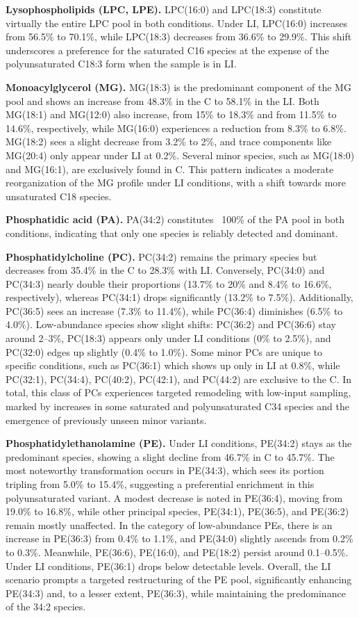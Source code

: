 \documentclass[10pt,letterpaper]{article}
\begin{document}
\textbf{Lysophospholipids (LPC, LPE).} 
LPC(16:0) and LPC(18:3) constitute virtually the entire LPC pool in both conditions. Under LI, LPC(16:0) increases from 56.5\% to 70.1\%, while LPC(18:3) decreases from 36.6\% to 29.9\%. This shift underscores a preference for the saturated C16 species at the expense of the polyunsaturated C18:3 form when the sample is in LI.

\textbf{Monoacylglycerol (MG).}  
MG(18:3) is the predominant component of the MG pool and shows an increase from 48.3\% in the C to 58.1\% in the LI. Both MG(18:1) and MG(12:0) also increase, from 15\% to 18.3\% and from 11.5\% to 14.6\%, respectively, while MG(16:0) experiences a reduction from 8.3\% to 6.8\%. MG(18:2) sees a slight decrease from 3.2\% to 2\%, and trace components like MG(20:4) only appear under LI at 0.2\%. Several minor species, such as MG(18:0) and MG(16:1), are exclusively found in C. This pattern indicates a moderate reorganization of the MG profile under LI conditions, with a shift towards more unsaturated C18 species.


\textbf{Phosphatidic acid (PA).}  
PA(34:2) constitutes ~100\% of the PA pool in both conditions, indicating that only one species is reliably detected and dominant.

\textbf{Phosphatidylcholine (PC).}  
PC(34:2) remains the primary species but decreases from 35.4\% in the C to 28.3\% with LI. Conversely, PC(34:0) and PC(34:3) nearly double their proportions (13.7\% to 20\% and 8.4\% to 16.6\%, respectively), whereas PC(34:1) drops significantly (13.2\% to 7.5\%). Additionally, PC(36:5) sees an increase (7.3\% to 11.4\%), while PC(36:4) diminishes (6.5\% to 4.0\%). Low-abundance species show slight shifts: PC(36:2) and PC(36:6) stay around 2–3\%, PC(18:3) appears only under LI conditions (0\% to 2.5\%), and PC(32:0) edges up slightly (0.4\% to 1.0\%). Some minor PCs are unique to specific conditions, such as PC(36:1) which shows up only in LI at 0.8\%, while PC(32:1), PC(34:4), PC(40:2), PC(42:1), and PC(44:2) are exclusive to the C. In total, this class of PCs experiences targeted remodeling with low-input sampling, marked by increases in some saturated and polyunsaturated C34 species and the emergence of previously unseen minor variants.

\textbf{Phosphatidylethanolamine (PE).}  
Under LI conditions, PE(34:2) stays as the predominant species, showing a slight decline from 46.7\% in C to 45.7\%. The most noteworthy transformation occurs in PE(34:3), which sees its portion tripling from 5.0\% to 15.4\%, suggesting a preferential enrichment in this polyunsaturated variant. A modest decrease is noted in PE(36:4), moving from 19.0\% to 16.8\%, while other principal species, PE(34:1), PE(36:5), and PE(36:2) remain mostly unaffected. In the category of low-abundance PEs, there is an increase in PE(36:3) from 0.4\% to 1.1\%, and PE(34:0) slightly ascends from 0.2\% to 0.3\%. Meanwhile, PE(36:6), PE(16:0), and PE(18:2) persist around 0.1–0.5\%. Under LI conditions, PE(36:1) drops below detectable levels. Overall, the LI scenario prompts a targeted restructuring of the PE pool, significantly enhancing PE(34:3) and, to a lesser extent, PE(36:3), while maintaining the predominance of the 34:2 species.
\end{document}
